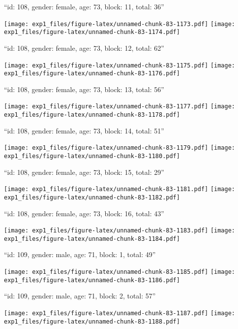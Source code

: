 \documentclass[11pt,,]{article}
\begin{document}
\newpage
[1] 

``id: 108, gender: female, age: 73, block: 11, total: 36''

\texttt{[image: exp1\_files/figure-latex/unnamed-chunk-83-1173.pdf]}
\texttt{[image: exp1\_files/figure-latex/unnamed-chunk-83-1174.pdf]}

\newpage
[1] 

``id: 108, gender: female, age: 73, block: 12, total: 62''

\texttt{[image: exp1\_files/figure-latex/unnamed-chunk-83-1175.pdf]}
\texttt{[image: exp1\_files/figure-latex/unnamed-chunk-83-1176.pdf]}

\newpage
[1] 

``id: 108, gender: female, age: 73, block: 13, total: 56''

\texttt{[image: exp1\_files/figure-latex/unnamed-chunk-83-1177.pdf]}
\texttt{[image: exp1\_files/figure-latex/unnamed-chunk-83-1178.pdf]}

\newpage
[1] 

``id: 108, gender: female, age: 73, block: 14, total: 51''

\texttt{[image: exp1\_files/figure-latex/unnamed-chunk-83-1179.pdf]}
\texttt{[image: exp1\_files/figure-latex/unnamed-chunk-83-1180.pdf]}

\newpage
[1] 

``id: 108, gender: female, age: 73, block: 15, total: 29''

\texttt{[image: exp1\_files/figure-latex/unnamed-chunk-83-1181.pdf]}
\texttt{[image: exp1\_files/figure-latex/unnamed-chunk-83-1182.pdf]}

\newpage
[1] 

``id: 108, gender: female, age: 73, block: 16, total: 43''

\texttt{[image: exp1\_files/figure-latex/unnamed-chunk-83-1183.pdf]}
\texttt{[image: exp1\_files/figure-latex/unnamed-chunk-83-1184.pdf]}

\newpage
[1] 

``id: 109, gender: male, age: 71, block: 1, total: 49''

\texttt{[image: exp1\_files/figure-latex/unnamed-chunk-83-1185.pdf]}
\texttt{[image: exp1\_files/figure-latex/unnamed-chunk-83-1186.pdf]}

\newpage
[1] 

``id: 109, gender: male, age: 71, block: 2, total: 57''

\texttt{[image: exp1\_files/figure-latex/unnamed-chunk-83-1187.pdf]}
\texttt{[image: exp1\_files/figure-latex/unnamed-chunk-83-1188.pdf]}
\end{document}
